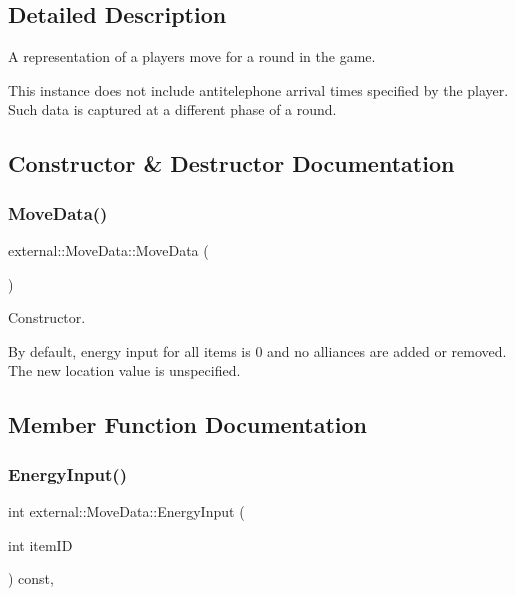 \subsection{Detailed Description}
A representation of a player\textquotesingle{}s move for a round in the game. 

This instance does not include antitelephone arrival times specified by the player. Such data is captured at a different phase of a round. 

\subsection{Constructor \& Destructor Documentation}
\mbox{\label{classexternal_1_1_move_data_a230c2389b03633b6b02928a867f59f27}} 
\subsubsection{\texorpdfstring{Move\+Data()}{MoveData()}}
{\footnotesize\ttfamily external\+::\+Move\+Data\+::\+Move\+Data (\begin{DoxyParamCaption}{ }\end{DoxyParamCaption})\hspace{0.3cm}{\ttfamily [inline]}}



Constructor. 

By default, energy input for all items is 0 and no alliances are added or removed. The new location value is unspecified. 

\subsection{Member Function Documentation}
\mbox{\label{classexternal_1_1_move_data_adec73e4cffd6895b046411a25aa516ff}} 
\subsubsection{\texorpdfstring{Energy\+Input()}{EnergyInput()}}
{\footnotesize\ttfamily int external\+::\+Move\+Data\+::\+Energy\+Input (\begin{DoxyParamCaption}\item[{int}]{item\+ID }\end{DoxyParamCaption}) const\hspace{0.3cm}{\ttfamily [inline]}, {\ttfamily [noexcept]}}



